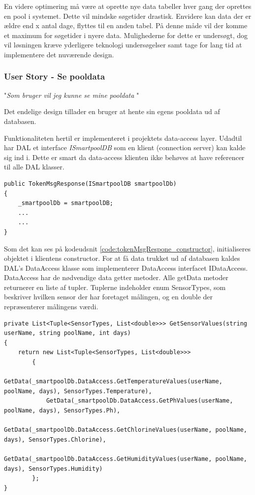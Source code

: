 En videre optimering må være at oprette nye data tabeller hver gang der oprettes en pool i systemet. Dette vil mindske søgetider drastisk. Envidere kan data der er ældre end x antal dage, flyttes til en anden tabel. På denne måde vil der komme et maximum for søgetider i nyere data.
Mulighederne for dette er undersøgt, dog vil løsningen kræve yderligere teknologi undersøgelser samt tage for lang tid at implementere det nuværende design.

\subsubsection{User Story - Se pooldata}

"\textit{Som bruger vil jeg kunne se mine pooldata }"

Det endelige design tillader en bruger at hente sin egens pooldata ud af databasen.

Funktionaliteten hertil er implementeret i projektets data-access layer. Udadtil har DAL et interface \textit{ISmartpoolDB} som en klient (connection server) kan kalde sig ind i. Dette er smart da data-access klienten ikke behøves at have referencer til alle DAL klasser.

\begin{lstlisting}[caption=TokenMsgResponse constructor,label=code:tokenMsgRespone_constructor]
public TokenMsgResponse(ISmartpoolDB smartpoolDb)
{
	_smartpoolDb = smartpoolDB;
	...
	...
}
\end{lstlisting}

Som det kan ses på kodeudsnit \ref{code:tokenMsgRespone_constructor}, initialiseres objektet i klientens constructor.
For at få data trukket ud af databasen kaldes DAL's DataAccess klasse som implementerer DataAccess interfacet IDataAccess. DataAccess har de nødvendige data getter metoder. Alle getData metoder returnerer en liste af tupler. Tuplerne indeholder enum SensorTypes, som beskriver hvilken sensor der har foretaget målingen, og en double der repræsenterer målingens værdi.

\begin{lstlisting}
private List<Tuple<SensorTypes, List<double>>> GetSensorValues(string userName, string poolName, int days)
{
	return new List<Tuple<SensorTypes, List<double>>>
		{
			GetData(_smartpoolDb.DataAccess.GetTemperatureValues(userName, poolName, days), SensorTypes.Temperature),
			GetData(_smartpoolDb.DataAccess.GetPhValues(userName, poolName, days), SensorTypes.Ph),
			GetData(_smartpoolDb.DataAccess.GetChlorineValues(userName, poolName, days), SensorTypes.Chlorine),
			GetData(_smartpoolDb.DataAccess.GetHumidityValues(userName, poolName, days), SensorTypes.Humidity)
		};
}
\end{lstlisting}

